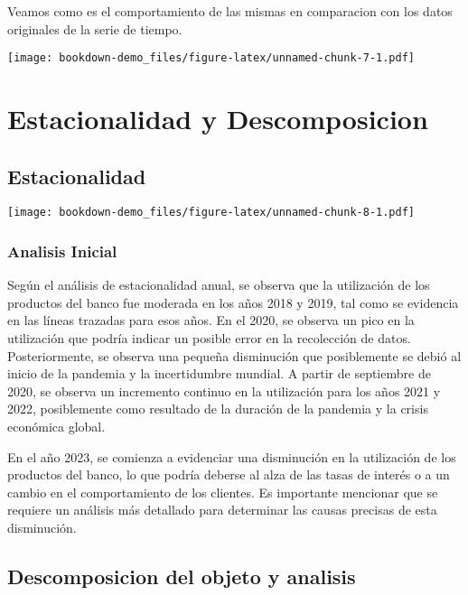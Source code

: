 \documentclass[
]{book}
\begin{document}
Veamos como es el comportamiento de las mismas en comparacion con los datos originales de la serie de tiempo.

\texttt{[image: bookdown-demo\_files/figure-latex/unnamed-chunk-7-1.pdf]}

\hypertarget{estacionalidad-y-descomposicion}{%
\chapter{Estacionalidad y Descomposicion}\label{estacionalidad-y-descomposicion}}

\hypertarget{Estacion}{%
\section{Estacionalidad}\label{Estacion}}

\texttt{[image: bookdown-demo\_files/figure-latex/unnamed-chunk-8-1.pdf]}

\hypertarget{analisis-inicial}{%
\subsection{Analisis Inicial}\label{analisis-inicial}}

Según el análisis de estacionalidad anual, se observa que la utilización de los productos del banco fue moderada en los años 2018 y 2019, tal como se evidencia en las líneas trazadas para esos años. En el 2020, se observa un pico en la utilización que podría indicar un posible error en la recolección de datos. Posteriormente, se observa una pequeña disminución que posiblemente se debió al inicio de la pandemia y la incertidumbre mundial. A partir de septiembre de 2020, se observa un incremento continuo en la utilización para los años 2021 y 2022, posiblemente como resultado de la duración de la pandemia y la crisis económica global.

En el año 2023, se comienza a evidenciar una disminución en la utilización de los productos del banco, lo que podría deberse al alza de las tasas de interés o a un cambio en el comportamiento de los clientes. Es importante mencionar que se requiere un análisis más detallado para determinar las causas precisas de esta disminución.

\hypertarget{descomposicion-del-objeto-y-analisis}{%
\section{Descomposicion del objeto y analisis}\label{descomposicion-del-objeto-y-analisis}}
\end{document}
